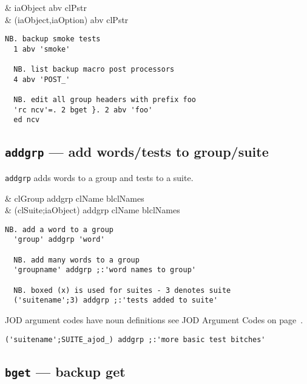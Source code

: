 \begin{wordhead}
\dyad & iaObject abv clPstr  \\
      & (iaObject,iaOption) abv clPstr \\
\end{wordhead}
\begin{lstlisting}[frame=single,framerule=0pt]
  NB. backup smoke tests 
  1 abv 'smoke' 
  
  NB. list backup macro post processors
  4 abv 'POST_'   
  
  NB. edit all group headers with prefix foo 
  'rc ncv'=. 2 bget }. 2 abv 'foo'
  ed ncv
\end{lstlisting}
 
\subsection{\texttt{addgrp} --- add words/tests to group/suite}\label{ss:addgrp} 

\texttt{addgrp} adds words to a group and tests to a suite. 

\begin{wordhead}
\dyad & clGroup addgrp clName \argsep blclNames \\
      & (clSuite;iaObject) addgrp clName \argsep blclNames \\
\end{wordhead}
\begin{lstlisting}[frame=single,framerule=0pt]
  NB. add a word to a group
  'group' addgrp 'word' 

  NB. add many words to a group 
  'groupname' addgrp ;:'word names to group'

  NB. boxed (x) is used for suites - 3 denotes suite
  ('suitename';3) addgrp ;:'tests added to suite'
\end{lstlisting}

JOD argument codes have noun definitions see JOD Argument Codes on page~\pageref{ap:objqualcodes}.

\begin{lstlisting}[frame=single,framerule=0pt]  
  ('suitename';SUITE_ajod_) addgrp ;:'more basic test bitches'
\end{lstlisting}

\subsection{\texttt{bget} --- backup get}\label{ss:bget} 

